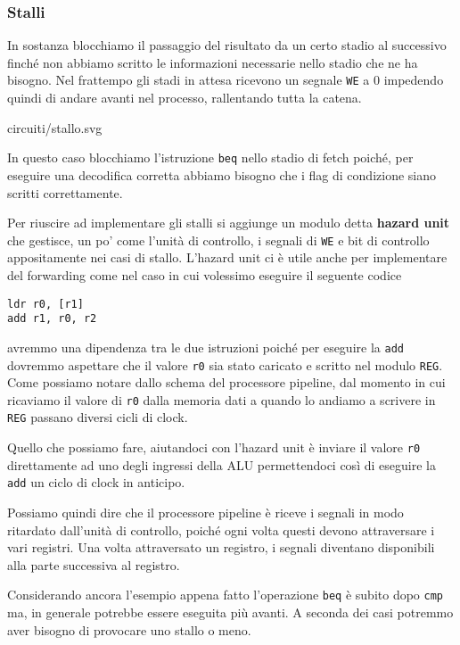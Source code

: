 \subsubsection{Stalli}
In sostanza blocchiamo il passaggio del risultato da un certo stadio al successivo finché non
abbiamo scritto le informazioni necessarie nello stadio che ne ha bisogno. Nel frattempo gli stadi
in attesa ricevono un segnale \verb|WE| a 0 impedendo quindi di andare avanti nel processo,
rallentando tutta la catena.
\begin{center}
	 {circuiti/stallo.svg}
\end{center}
In questo caso blocchiamo l'istruzione \verb|beq| nello stadio di fetch poiché, per eseguire una
decodifica corretta abbiamo bisogno che i flag di condizione siano scritti correttamente.

Per riuscire ad implementare gli stalli si aggiunge un modulo detta \textbf{hazard unit} che
gestisce, un po' come l'unità di controllo, i segnali di \verb|WE| e bit di controllo appositamente
nei casi di stallo. L'hazard unit ci è utile anche per implementare del forwarding come nel caso in
cui volessimo eseguire il seguente codice
\begin{verbatim}
ldr r0, [r1]
add r1, r0, r2
\end{verbatim}
avremmo una dipendenza tra le due istruzioni poiché per eseguire la \verb|add| dovremmo aspettare
che il valore \verb|r0| sia stato caricato e scritto nel modulo \verb|REG|. Come possiamo notare
dallo schema del processore pipeline, dal momento in cui ricaviamo il valore di \verb|r0| dalla
memoria dati a quando lo andiamo a scrivere in \verb|REG| passano diversi cicli di clock.

Quello che possiamo fare, aiutandoci con l'hazard unit è inviare il valore \verb|r0| direttamente
ad uno degli ingressi della ALU permettendoci così di eseguire la \verb|add| un ciclo di clock in
anticipo.

\begin{tcolorbox}
	Possiamo quindi dire che il processore pipeline è riceve i segnali in modo ritardato dall'unità
	di controllo, poiché ogni volta questi devono attraversare i vari registri. Una volta
	attraversato un registro, i segnali diventano disponibili alla parte successiva al registro.
\end{tcolorbox}

Considerando ancora l'esempio appena fatto l'operazione \verb|beq| è subito dopo \verb|cmp| ma, in
generale potrebbe essere eseguita più avanti. A seconda dei casi potremmo aver bisogno di provocare
uno stallo o meno.

